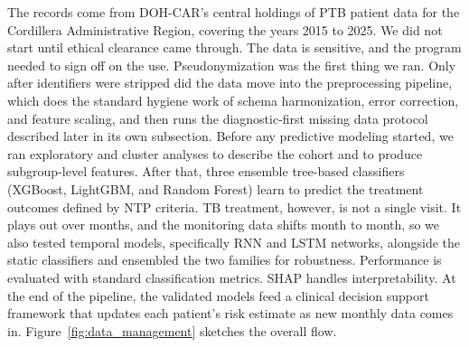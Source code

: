 \documentclass[12pt]{article}
\renewcommand{\_}{\textunderscore\allowbreak}
\begin{document}
The records come from DOH-CAR's central holdings of PTB patient data for the Cordillera Administrative Region, covering the years 2015 to 2025. We did not start until ethical clearance came through. The data is sensitive, and the program needed to sign off on the use. Pseudonymization was the first thing we ran. Only after identifiers were stripped did the data move into the preprocessing pipeline, which does the standard hygiene work of schema harmonization, error correction, and feature scaling, and then runs the diagnostic-first missing data protocol described later in its own subsection. Before any predictive modeling started, we ran exploratory and cluster analyses to describe the cohort and to produce subgroup-level features. After that, three ensemble tree-based classifiers (XGBoost, LightGBM, and Random Forest) learn to predict the treatment outcomes defined by NTP criteria. TB treatment, however, is not a single visit. It plays out over months, and the monitoring data shifts month to month, so we also tested temporal models, specifically RNN and LSTM networks, alongside the static classifiers and ensembled the two families for robustness. Performance is evaluated with standard classification metrics. SHAP handles interpretability. At the end of the pipeline, the validated models feed a clinical decision support framework that updates each patient's risk estimate as new monthly data comes in. Figure~\ref{fig:data_management} sketches the overall flow.
\end{document}
